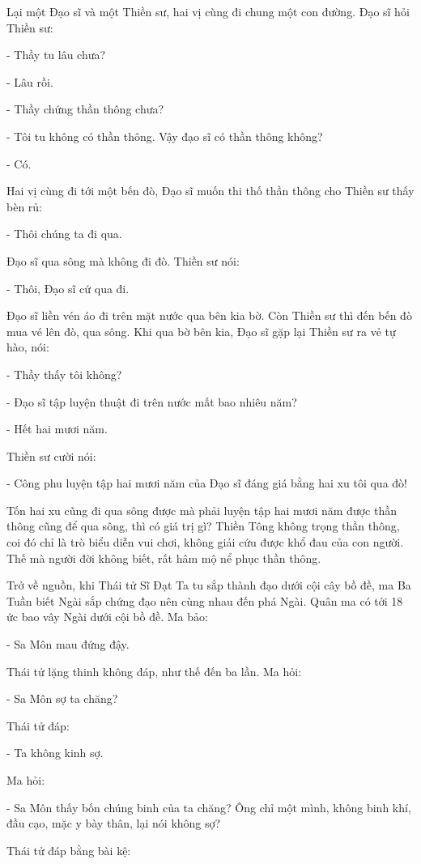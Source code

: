 \documentclass[
  12pt,
  oneside]{book}
\begin{document}
Lại một Đạo sĩ và một Thiền sư, hai vị cùng đi chung một con đường. Đạo sĩ hỏi Thiền sư:

- Thầy tu lâu chưa?

- Lâu rồi.

- Thầy chứng thần thông chưa?

- Tôi tu không có thần thông. Vậy đạo sĩ có thần thông không?

- Có.

Hai vị cùng đi tới một bến đò, Đạo sĩ muốn thi thố thần thông cho Thiền sư thấy bèn rủ:

- Thôi chúng ta đi qua.

Đạo sĩ qua sông mà không đi đò. Thiền sư nói:

- Thôi, Đạo sĩ cứ qua đi.

Đạo sĩ liền vén áo đi trên mặt nước qua bên kia bờ. Còn Thiền sư thì đến bến đò mua vé lên đò, qua sông. Khi qua bờ bên kia, Đạo sĩ gặp lại Thiền sư ra vẻ tự hào, nói:

- Thầy thấy tôi không?

- Đạo sĩ tập luyện thuật đi trên nước mất bao nhiêu năm?

- Hết hai mươi năm.

Thiền sư cười nói:

- Công phu luyện tập hai mươi năm của Đạo sĩ đáng giá bằng hai xu tôi qua đò!

Tốn hai xu cũng đi qua sông được mà phải luyện tập hai mươi năm được thần thông cũng để qua sông, thì có giá trị gì? Thiền Tông không trọng thần thông, coi đó chỉ là trò biểu diễn vui chơi, không giải cứu được khổ đau của con người. Thế mà người đời không biết, rất hâm mộ nể phục thần thông.

Trở về nguồn, khi Thái tử Sĩ Đạt Ta tu sắp thành đạo dưới cội cây bồ đề, ma Ba Tuần biết Ngài sắp chứng đạo nên cùng nhau đến phá Ngài. Quân ma có tới 18 ức bao vây Ngài dưới cội bồ đề. Ma bảo:

- Sa Môn mau đứng đậy.

Thái tử lặng thinh không đáp, như thế đến ba lần. Ma hỏi:

- Sa Môn sợ ta chăng?

Thái tử đáp:

- Ta không kinh sợ.

Ma hỏi:

- Sa Môn thấy bốn chúng binh của ta chăng? Ông chỉ một mình, không binh khí, đầu cạo, mặc y bày thân, lại nói không sợ?

Thái tử đáp bằng bài kệ:
\end{document}

